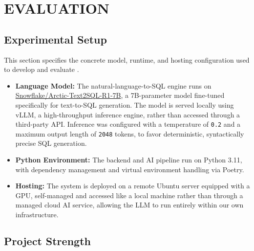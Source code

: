 \section{EVALUATION}
\label{sec:evaluation}



\subsection{Experimental Setup}
\label{sub:experimental-setup}

This section specifies the concrete model, runtime, and hosting configuration
used to develop and evaluate \projname{}.

\begin{itemize}
  \item \textbf{Language Model:} The natural-language-to-SQL engine
      runs on \href{https://huggingface.co/Snowflake/Arctic-Text2SQL-R1-7B}{Snowflake/Arctic-Text2SQL-R1-7B},
      a 7B-parameter model fine-tuned specifically for text-to-SQL
      generation. The model is served locally using vLLM, a
      high-throughput inference engine, rather than accessed through a
      third-party API. Inference was configured with a temperature of
      \texttt{0.2} and a maximum output length of \texttt{2048} tokens, to
      favor deterministic, syntactically precise SQL generation.
  \item \textbf{Python Environment:} The backend and AI pipeline run on
      Python 3.11, with dependency management and virtual environment
      handling via Poetry.
  \item \textbf{Hosting:} The system is deployed on a remote Ubuntu server
      equipped with a GPU, self-managed and accessed like a local
      machine rather than through a managed cloud AI service, allowing
      the LLM to run entirely within our own infrastructure.
\end{itemize}

\subsection{Project Strength}
\label{sub:project-strength}

